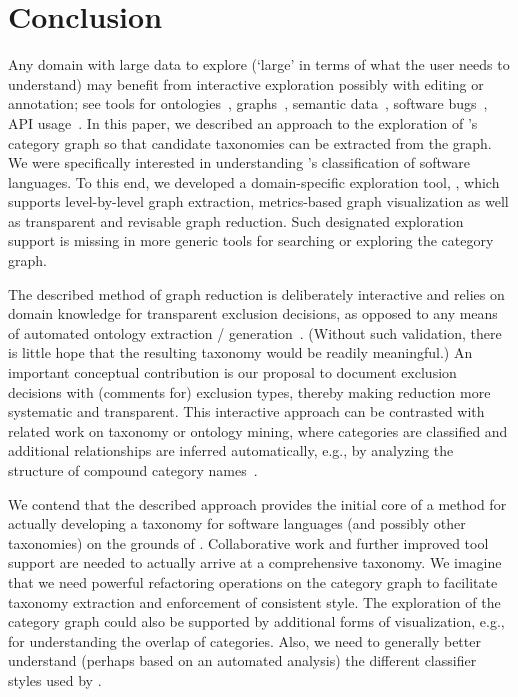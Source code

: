 
\section{Conclusion}
\label{S:concl}

\vspace{-27\in}

Any domain with large data to explore (`large' in terms of what the user needs to understand) may benefit from interactive exploration possibly with editing or annotation; see tools for ontologies~\cite{BaskayaKJ10}, graphs~\cite{HaunNKTB10}, semantic data~\cite{DumasBHS12}, software bugs~\cite{HoraADBCVM12}, API usage~\cite{RooverLP13}. In this paper, we described an approach to the exploration of \Wikipedia's category graph so that candidate taxonomies can be extracted from the graph. We were specifically interested in understanding \Wikipedia's classification of software languages. To this end, we developed a domain-specific exploration tool, \WikiTax, which supports level-by-level graph extraction, metrics-based graph visualization as well as transparent and revisable graph reduction. Such designated exploration support is missing in more generic tools for searching or exploring the category graph.

The described method of graph reduction is deliberately interactive and relies on domain knowledge for transparent exclusion decisions, as opposed to any means of automated ontology extraction / generation~\cite{SuchanekKW08,WuW08}. (Without such validation, there is little hope that the resulting taxonomy would be readily meaningful.) An important conceptual contribution is our proposal to document exclusion decisions with (comments for) exclusion types, thereby making reduction more systematic and transparent. This interactive approach can be contrasted with related work on taxonomy or ontology mining, where categories are classified and additional relationships are inferred automatically, e.g., by analyzing the structure of compound category names~\cite{NastaseS08}.

We contend that the described approach provides the initial core of a method for actually developing a taxonomy for software languages (and possibly other taxonomies) on the grounds of \Wikipedia. Collaborative work and further improved tool support are needed to actually arrive at a comprehensive taxonomy. We imagine that we need powerful refactoring operations on the category graph to facilitate taxonomy extraction and enforcement of consistent style. The exploration of the category graph could also be supported by additional forms of visualization, e.g., for understanding the overlap of categories. Also, we need to generally better understand (perhaps based on an automated analysis) the different classifier styles used by \Wikipedia.

